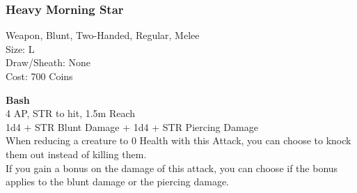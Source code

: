 \subsubsection{Heavy Morning Star}\label{weapon:heavyMorningStar}
Weapon, Blunt, Two-Handed, Regular, Melee\\
Size: L\\
Draw/Sheath: None\\
Cost: 700 Coins

\textbf{Bash}\\
4 AP, STR to hit, 1.5m Reach\\
1d4 + \texttimes STR Blunt Damage + 1d4 + \texttimes STR Piercing Damage\\
When reducing a creature to 0 Health with this Attack, you can choose to knock them out instead of killing them.\\
If you gain a bonus on the damage of this attack, you can choose if the bonus applies to the blunt damage or the piercing damage.